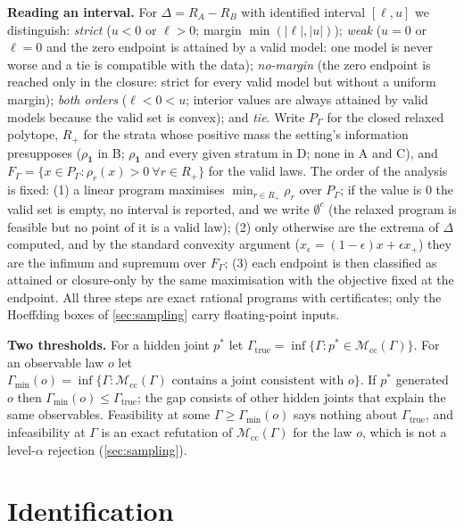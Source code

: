\documentclass{article}
\theoremstyle{plain}
\theoremstyle{definition}
\theoremstyle{remark}
\newcommand{\one}{\mathbf{1}}
\newcommand{\Mcc}{\mathcal{M}_{\mathrm{cc}}}
\begin{document}
\textbf{Reading an interval.} For $\Delta=R_A-R_B$ with identified interval
$[\ell,u]$ we distinguish: \emph{strict} ($u<0$ or $\ell>0$; margin
$\min(|\ell|,|u|)$); \emph{weak} ($u=0$ or $\ell=0$ and the zero endpoint is
attained by a valid model: one model is never worse and a tie is compatible
with the data); \emph{no-margin} (the zero endpoint is reached only in the
closure: strict for every valid model but without a uniform margin);
\emph{both orders} ($\ell<0<u$; interior values are always attained by valid
models because the valid set is convex); and \emph{tie}. Write $P_\Gamma$ for
the closed relaxed polytope, $R_+$ for the strata whose positive mass the
setting's information presupposes ($\rho_{\one}$ in B; $\rho_{\one}$ and every
given stratum in D; none in A and C), and
$F_\Gamma=\{x\in P_\Gamma:\rho_r(x)>0\ \forall r\in R_+\}$ for the valid laws. The
order of the analysis is fixed: (1) a linear program maximises
$\min_{r\in R_+}\rho_r$ over $P_\Gamma$; if the value is $0$ the valid set is
empty, no interval is reported, and we write $\emptyset^{c}$ (the relaxed
program is feasible but no point of it is a valid law); (2) only otherwise are
the extrema of $\Delta$ computed, and by the standard convexity argument
($x_\epsilon=(1-\epsilon)x+\epsilon x_+$) they are the infimum and supremum over
$F_\Gamma$; (3) each endpoint is then classified as attained or closure-only by
the same maximisation with the objective fixed at the endpoint. All three
steps are exact rational programs with certificates; only the Hoeffding boxes
of \cref{sec:sampling} carry floating-point inputs.

\textbf{Two thresholds.} For a hidden joint $p^*$ let
$\Gamma_{\mathrm{true}}=\inf\{\Gamma:p^*\in\Mcc(\Gamma)\}$. For an observable law
$o$ let $\Gamma_{\min}(o)=\inf\{\Gamma:\Mcc(\Gamma)\text{ contains a joint
consistent with }o\}$. If $p^*$ generated $o$ then
$\Gamma_{\min}(o)\le\Gamma_{\mathrm{true}}$; the gap consists of other hidden
joints that explain the same observables. Feasibility at some
$\Gamma\ge\Gamma_{\min}(o)$ says nothing about $\Gamma_{\mathrm{true}}$, and
infeasibility at $\Gamma$ is an exact refutation of $\Mcc(\Gamma)$ for the
law $o$, which is not a level-$\alpha$ rejection (\cref{sec:sampling}).

\section{Identification}
\label{sec:ident}
\end{document}
